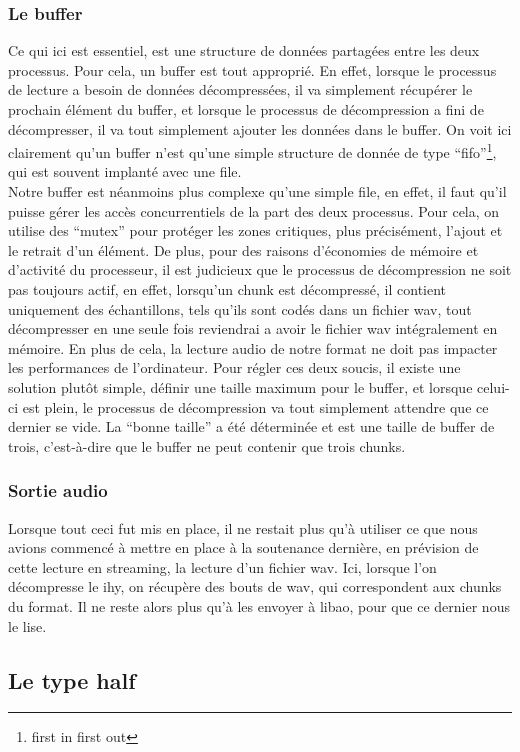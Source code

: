 \documentclass[a4paper,12pt]{article}
\begin{document}
		\subsubsection{Le buffer}
Ce qui ici est essentiel, est une structure de données partagées entre les
deux processus. Pour cela, un buffer est
tout approprié. En effet, lorsque le processus de lecture a besoin de données
décompressées, il va simplement récupérer le prochain élément du buffer, et
lorsque le processus de décompression a fini de décompresser, il va tout
simplement ajouter les données dans le buffer. On voit ici clairement qu'un
buffer n'est qu'une simple structure de donnée de type ``fifo''\footnote{first
in first out}, qui est souvent implanté avec une file.\\
Notre buffer est néanmoins plus complexe qu'une simple file, en effet, il faut
qu'il puisse gérer les accès concurrentiels de la part des deux processus. Pour
cela, on utilise des ``mutex'' pour protéger les zones critiques, plus
précisément, l'ajout et le retrait d'un élément. De plus, pour des raisons
d'économies de mémoire et d'activité du processeur, il est judicieux que le processus de décompression ne
soit pas toujours actif, en effet, lorsqu'un chunk est décompressé, il contient
uniquement des échantillons, tels qu'ils sont codés dans un fichier wav, tout
décompresser en une seule fois reviendrai a avoir le fichier wav intégralement
en mémoire. En plus de cela, la lecture audio de notre format ne doit pas
impacter les performances de l'ordinateur. Pour régler ces deux soucis, il
existe une solution plutôt simple, définir une taille maximum pour le buffer, et
lorsque celui-ci est plein, le processus de décompression va tout simplement
attendre que ce dernier se vide. La ``bonne taille'' a été déterminée et est une
taille de buffer de trois, c'est-à-dire que le buffer ne peut contenir que
trois chunks.\\
		\subsubsection{Sortie audio}
Lorsque tout ceci fut mis en place, il ne restait plus qu'à utiliser ce que nous
avions commencé à mettre en place à la soutenance dernière, en prévision de
cette lecture en streaming, la lecture d'un fichier wav. Ici, lorsque l'on
décompresse le ihy, on récupère des bouts de wav, qui correspondent aux chunks
du format. Il ne reste alors plus qu'à les envoyer à libao, pour que ce dernier
nous le lise.
	\subsection{Le type half}
\end{document}
